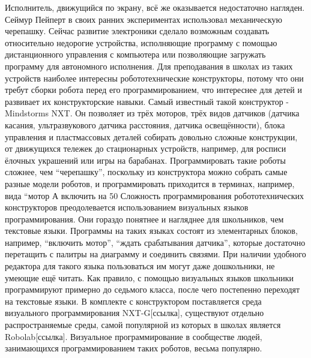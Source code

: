 	Исполнитель, движущийся по экрану, всё же оказывается недостаточно нагляден. Сеймур Пейперт в своих ранних экспериментах использовал механическую черепашку. Сейчас развитие электроники сделало возможным создавать относительно недорогие устройства, исполняющие программу с помощью дистанционного управления с компьютера или позволяющие загружать программу для автономного исполнения. Для преподавания в школах из таких устройств наиболее интересны робототехнические конструкторы, потому что они требут сборки робота перед его программированием, что интереснее для детей и развивает их конструкторские навыки. Самый известный такой конструктор - Mindstorms NXT. Он позволяет из трёх моторов, трёх видов датчиков (датчика касания, ультразвукового датчика расстояния, датчика освещённости), блока управления и пластмассовых деталей собирать довольно сложные конструкции, от движущихся тележек до стационарных устройств, например, для росписи ёлочных украшений или игры на барабанах. 
	Программировать такие роботы сложнее, чем “черепашку”, поскольку из конструктора можно собрать самые разные модели роботов, и программировать приходится в терминах, например, вида “мотор А включить на 50%
	Сложность программирования робототехнических конструкторов преодолевается использованием визуальных языков программирования. Они гораздо понятнее и нагляднее для школьников, чем текстовые языки. Программы на таких языках состоят из элементарных блоков, например, “включить мотор”, “ждать срабатывания датчика”, которые достаточно перетащить с палитры на диаграмму и соединить связями. При наличии удобного редактора для такого языка пользоваться им могут даже дошкольники, не умеющие ещё читать. Как правило, с помощью визуальных языков школьники программируют примерно до седьмого класса, после чего постепенно переходят на текстовые языки. В комплекте с конструктором поставляется среда визуального программирования NXT-G[ссылка], существуют отдельно распространяемые среды, самой популярной из которых в школах является Robolab[ссылка]. Визуальное программирование в сообществе людей, занимающихся программированием таких роботов, весьма популярно.
